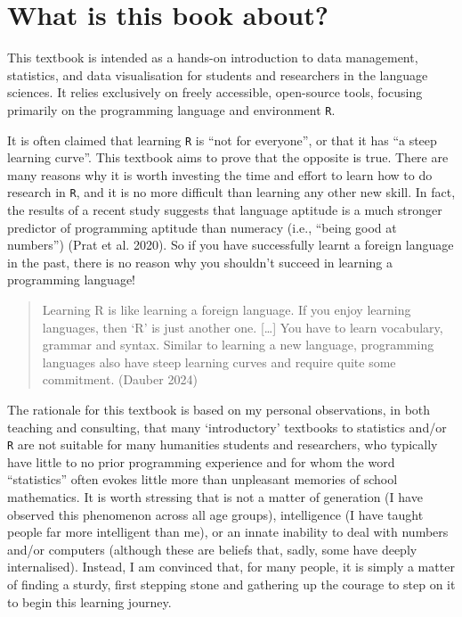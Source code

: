 \documentclass[
  letterpaper,
  DIV=11,
  numbers=noendperiod]{scrreprt}
\begin{document}
\section*{What is this book about?}\label{what-is-this-book-about}


This textbook is intended as a hands-on introduction to data management,
statistics, and data visualisation for students and researchers in the
language sciences. It relies exclusively on freely accessible,
open-source tools, focusing primarily on the programming language and
environment \texttt{R}.

It is often claimed that learning \texttt{R} is ``not for everyone'', or
that it has ``a steep learning curve''. This textbook aims to prove that
the opposite is true. There are many reasons why it is worth investing
the time and effort to learn how to do research in \texttt{R}, and it is
no more difficult than learning any other new skill. In fact, the
results of a recent study suggests that language aptitude is a much
stronger predictor of programming aptitude than numeracy (i.e., ``being
good at numbers'') (Prat et al. 2020). So if you have successfully
learnt a foreign language in the past, there is no reason why you
shouldn't succeed in learning a programming language!

\begin{quote}
Learning R is like learning a foreign language. If you enjoy learning
languages, then `R' is just another one. {[}\ldots{]} You have to learn
vocabulary, grammar and syntax. Similar to learning a new language,
programming languages also have steep learning curves and require quite
some commitment. (Dauber 2024)
\end{quote}

The rationale for this textbook is based on my personal observations, in
both teaching and consulting, that many `introductory' textbooks to
statistics and/or \texttt{R} are not suitable for many humanities
students and researchers, who typically have little to no prior
programming experience and for whom the word ``statistics'' often evokes
little more than unpleasant memories of school mathematics. It is worth
stressing that is not a matter of generation (I have observed this
phenomenon across all age groups), intelligence (I have taught people
far more intelligent than me), or an innate inability to deal with
numbers and/or computers (although these are beliefs that, sadly, some
have deeply internalised). Instead, I am convinced that, for many
people, it is simply a matter of finding a sturdy, first stepping stone
and gathering up the courage to step on it to begin this learning
journey.
\end{document}
